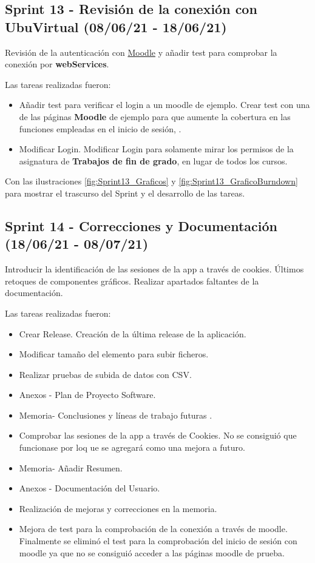 \subsection{Sprint 13 - Revisión de la conexión con UbuVirtual (08/06/21 - 18/06/21)}
Revisión de la autenticación con \href{https://moodle.org/}{Moodle} y añadir test para comprobar la conexión por \textbf{webServices}.

Las tareas realizadas fueron:
\begin{itemize}
	\item Añadir test para verificar el login a un moodle de ejemplo.
		Crear test con una de las páginas \textbf{Moodle} de ejemplo para que aumente la cobertura en las funciones empleadas en el inicio de sesión, .
	\item Modificar Login.
		Modificar Login para solamente mirar los permisos de la asignatura de \textbf{Trabajos de fin de grado}, en lugar de todos los cursos.
\end{itemize}

Con las ilustraciones \ref{fig:Sprint13_Graficos} y \ref{fig:Sprint13_GraficoBurndown} para mostrar el trascurso del Sprint y el desarrollo de las tareas.


\subsection{Sprint 14 - Correcciones y Documentación (18/06/21 - 08/07/21)}
Introducir la identificación de las sesiones de la app a través de cookies. Últimos retoques de componentes gráficos. Realizar apartados faltantes de la documentación.

Las tareas realizadas fueron:
\begin{itemize}
	\item Crear Release. Creación de la última release de la aplicación.
	\item Modificar tamaño del elemento para subir ficheros.
	\item Realizar pruebas de subida de datos con CSV.
	\item Anexos - Plan de Proyecto Software.
	\item Memoria- Conclusiones y líneas de trabajo futuras .
	\item Comprobar las sesiones de la app a través de Cookies. No se consiguió que funcionase por loq ue se agregará como una mejora a futuro.
	\item Memoria- Añadir Resumen. 
	\item Anexos - Documentación del Usuario.
	\item Realización de mejoras y correcciones en la memoria.
	\item Mejora de test para la comprobación de la conexión a través de moodle. Finalmente se eliminó el test para la comprobación del inicio de sesión con moodle ya que no se consiguió acceder a las páginas moodle de prueba.
\end{itemize}

